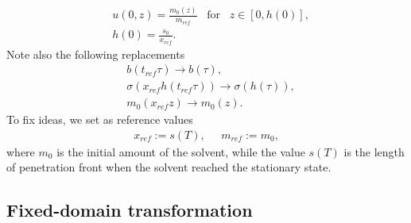 \documentclass{article}
\begin{document}
\begin{align}
\label{a22}&u(0, z) = \frac{m_0( z)}{ m_{ref}} \;\;\; \text{for}\;\;\; z\in[0,  h(0)],\\
\label{a23}& h(0) = \frac{s_0}{x_{ref}}.
\end{align}
Note also the following replacements 
\begin{align*}
&b(t_{ref} \tau) \rightarrow b(\tau),\\
&\sigma(x_{ref}h(t_{ref} \tau)) \rightarrow \sigma(h(\tau)),\\
&m_0(x_{ref} z) \rightarrow m_0(z).
\end{align*}
To fix ideas, we set as reference values \begin{align}
x_{ref} :=  s(T),\;\;\;\;\;
m_{ref} := m_0,
\end{align}
where $m_0$ is the initial amount of the solvent, while  the value $s(T)$ is the length of  penetration front when the solvent reached the stationary state. 

\subsection{Fixed-domain transformation}
\end{document}
